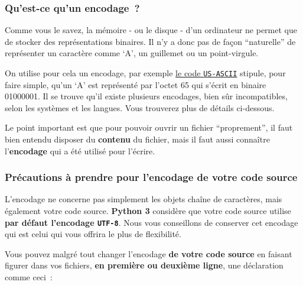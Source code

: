     \begin{Shaded}
\begin{Highlighting}[frame=lines,framerule=0.6mm,rulecolor=\color{asisframecolor}]
\end{Highlighting}
\end{Shaded}

    \hypertarget{quest-ce-quun-encodage}{%
\subsubsection{Qu'est-ce qu'un
encodage~?}\label{quest-ce-quun-encodage}}

    Comme vous le savez, la mémoire - ou le disque - d'un ordinateur ne
permet que de stocker des représentations binaires. Il n'y a donc pas de
façon ``naturelle'' de représenter un caractère comme `A', un guillemet
ou un point-virgule.

On utilise pour cela un encodage, par exemple
\href{http://www.asciitable.com/}{le code \texttt{US-ASCII}} stipule,
pour faire simple, qu'un `A' est représenté par l'octet 65 qui s'écrit
en binaire 01000001. Il se trouve qu'il existe plusieurs encodages, bien
sûr incompatibles, selon les systèmes et les langues. Vous trouverez
plus de détails ci-dessous.

Le point important est que pour pouvoir ouvrir un fichier
``proprement'', il faut bien entendu disposer du \textbf{contenu} du
fichier, mais il faut aussi connaître l'\textbf{encodage} qui a été
utilisé pour l'écrire.

    \hypertarget{pruxe9cautions-uxe0-prendre-pour-lencodage-de-votre-code-source}{%
\subsubsection{Précautions à prendre pour l'encodage de votre code
source}\label{pruxe9cautions-uxe0-prendre-pour-lencodage-de-votre-code-source}}

    L'encodage ne concerne pas simplement les objets chaîne de caractères,
mais également votre code source. \textbf{Python 3} considère que votre
code source utilise \textbf{par défaut l'encodage \texttt{UTF-8}}. Nous
vous conseillons de conserver cet encodage qui est celui qui vous
offrira le plus de flexibilité.

    Vous pouvez malgré tout changer l'encodage \textbf{de votre code source}
en faisant figurer dans vos fichiers, \textbf{en première ou deuxième
ligne}, une déclaration comme ceci~:

